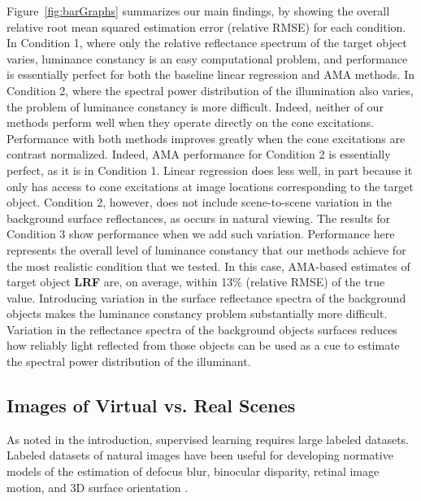 \documentclass{jov}
\providecommand{\DIFaddtex}[1]{{\bf #1}} %
\providecommand{\DIFdeltex}[1]{} %
\providecommand{\DIFaddbegin}{} %
\providecommand{\DIFaddend}{} %
\providecommand{\DIFdelbegin}{} %
\providecommand{\DIFdelend}{} %
\providecommand{\DIFadd}[1]{\texorpdfstring{\DIFaddtex{#1}}{#1}} %
\providecommand{\DIFdel}[1]{\texorpdfstring{\DIFdeltex{#1}}{}} %
\newcommand{\DIFscaledelfig}{0.5}
\newlength{\DIFdelgraphicswidth} %
\newlength{\DIFdelgraphicsheight} %
\newcommand{\DIFaddincludegraphics}[2][]{{\color{blue}\fbox{\DIFOincludegraphics[#1]{#2}}}} %
\newcommand{\DIFdelincludegraphics}[2][]{%
\sbox{\DIFdelgraphicsbox}{\DIFOincludegraphics[#1]{#2}}%
\settoboxwidth{\DIFdelgraphicswidth}{\DIFdelgraphicsbox} %
\settoboxtotalheight{\DIFdelgraphicsheight}{\DIFdelgraphicsbox} %
\scalebox{\DIFscaledelfig}{%
\parbox[b]{\DIFdelgraphicswidth}{\usebox{\DIFdelgraphicsbox}\\[-\baselineskip] \rule{\DIFdelgraphicswidth}{0em}}\llap{\resizebox{\DIFdelgraphicswidth}{\DIFdelgraphicsheight}{%
\setlength{\unitlength}{\DIFdelgraphicswidth}%
\begin{picture}(1,1)%
\thicklines\linethickness{2pt} %
{\color[rgb]{1,0,0}\put(0,0){\framebox(1,1){}}}%
{\color[rgb]{1,0,0}\put(0,0){\line( 1,1){1}}}%
{\color[rgb]{1,0,0}\put(0,1){\line(1,-1){1}}}%
\end{picture}%
}\hspace*{3pt}}} %
} %
\DeclareRobustCommand{\DIFaddbegin}{\DIFOaddbegin \let\includegraphics\DIFaddincludegraphics} %
\DeclareRobustCommand{\DIFaddend}{\DIFOaddend \let\includegraphics\DIFOincludegraphics} %
\DeclareRobustCommand{\DIFdelbegin}{\DIFOdelbegin \let\includegraphics\DIFdelincludegraphics} %
\DeclareRobustCommand{\DIFdelend}{\DIFOaddend \let\includegraphics\DIFOincludegraphics} %
\begin{document}
Figure~\ref{fig:barGraphs} summarizes our main findings, by showing the overall relative root mean squared estimation error (relative RMSE) for each condition. 
In Condition 1, where only the relative reflectance spectrum of the target object varies, 
luminance constancy is an easy computational problem,
and performance is essentially perfect for both the baseline linear regression and AMA methods.
In Condition 2, where the spectral power distribution of the illumination also varies, the problem of luminance constancy is more difficult.
Indeed, neither of our methods perform well when they operate directly on the cone excitations.
Performance with both methods improves greatly when the cone excitations are contrast normalized. 
Indeed, AMA performance for Condition 2 is essentially perfect, as it is in Condition 1.
Linear regression does less well, in part because it only has access to cone excitations at image locations
corresponding to the target object.
Condition 2, however, does not include scene-to-scene variation in the background surface reflectances,
as occurs in natural viewing.
The results for Condition 3 show performance when we add such variation.
Performance here represents the overall level of luminance constancy that our methods achieve for the
most realistic condition that we tested.
In this case, AMA-based estimates of target object \DIFdelbegin \DIFdel{LRV }\DIFdelend \DIFaddbegin \DIFadd{LRF }\DIFaddend are, on average, within 13\% (relative RMSE) of the true value.
Introducing variation in the surface reflectance spectra of the background objects makes 
the luminance constancy problem substantially more difficult. 
Variation in the reflectance spectra of the background objects surfaces reduces how 
reliably light reflected from those objects can be used as a cue to estimate the spectral power distribution of the illuminant.

\subsection{Images of Virtual vs. Real Scenes}
As noted in the introduction, supervised learning requires large labeled datasets. Labeled datasets of natural images have been useful for developing normative models of the estimation of defocus blur, binocular disparity, retinal image motion, and 3D surface orientation \cite{burge2011optimal, burge2012optimal, burge2014optimal, burge2015optimal, sebastian2015defocus, kim2018lawful, burge2010natural, girshick2011cardinal, burge2016estimating, goncalves2017not}. 
\end{document}
